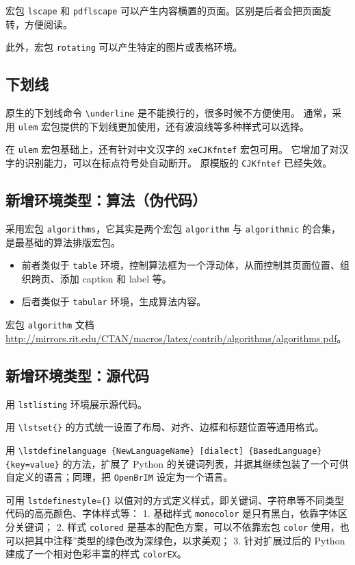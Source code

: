 \documentclass[../Main/thesis.tex]{subfiles}
\begin{document}
宏包 \texttt{lscape} 和 \texttt{pdflscape}
可以产生内容横置的页面。区别是后者会把页面旋转，方便阅读。

此外，宏包 \texttt{rotating} 可以产生特定的图片或表格环境。

\subsection{下划线}

原生的下划线命令 \texttt{\textbackslash{}underline}
是不能换行的，很多时候不方便使用。 通常，采用 \texttt{ulem}
宏包提供的下划线更加使用，还有波浪线等多种样式可以选择。

在 \texttt{ulem} 宏包基础上，还有针对中文汉字的
\texttt{xeCJKfntef} 宏包可用。
它增加了对汉字的识别能力，可以在标点符号处自动断开。 原模版的
\texttt{CJKfntef} 已经失效。

\subsection{新增环境类型：算法（伪代码）}

采用宏包 \texttt{algorithms}，它其实是两个宏包
\texttt{algorithm} 与 \texttt{algorithmic}
的合集，是最基础的算法排版宏包。

\begin{itemize}
\item
  前者类似于 \texttt{table}
  环境，控制算法框为一个浮动体，从而控制其页面位置、组织跨页、添加
  caption 和 label 等。
\item
  后者类似于 \texttt{tabular} 环境，生成算法内容。
\end{itemize}

宏包 \texttt{algorithm} 文档
\url{http://mirrors.rit.edu/CTAN/macros/latex/contrib/algorithms/algorithms.pdf}。

\subsection{新增环境类型：源代码}

用 \texttt{lstlisting} 环境展示源代码。

用 \texttt{\textbackslash{}lstset\{\}}
的方式统一设置了布局、对齐、边框和标题位置等通用格式。

用
\texttt{\textbackslash{}lstdefinelanguage \{NewLanguageName\} [dialect] \{BasedLanguage\} \{key=value\}}
的方法，扩展了 Python
的关键词列表，并据其继续包装了一个可供自定义的语言；同理，把
\texttt{OpenBrIM} 设定为一个语言。

可用 \texttt{lstdefinestyle=\{\}}
以值对的方式定义样式，即关键词、字符串等不同类型代码的高亮颜色、字体样式等：
1. 基础样式 \texttt{monocolor} 是只有黑白，依靠字体区分关键词； 2. 样式
\texttt{colored} 是基本的配色方案，可以不依靠宏包 \texttt{color}
使用，也可以把其中注释''类型的绿色改为深绿色，以求美观； 3.
针对扩展过后的 Python 建成了一个相对色彩丰富的样式 \texttt{colorEX}。
\end{document}
